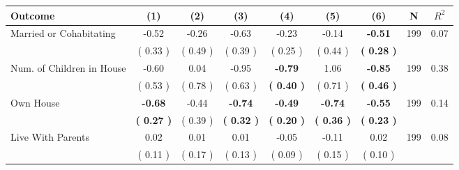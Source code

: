 \begin{tabular}{lcccccccc}
\toprule
 \textbf{Outcome} & \textbf{(1)} & \textbf{(2)} & \textbf{(3)} & \textbf{(4)} & \textbf{(5)} & \textbf{(6)} & \textbf{N} & \textbf{$ R^2$} \\
\midrule
Married or Cohabitating &     -0.52 &     -0.26 &     -0.63 &     -0.23 &     -0.14 & \textbf{    -0.51} & 199 &       0.07 \\ 
 & (     0.33 ) & (     0.49 ) & (     0.39 ) & (     0.25 ) & (     0.44 ) & \textbf{(     0.28 )} & \\
Num. of Children in House &     -0.60 &      0.04 &     -0.95 & \textbf{    -0.79} &      1.06 & \textbf{    -0.85} & 199 &       0.38 \\ 
 & (     0.53 ) & (     0.78 ) & (     0.63 ) & \textbf{(     0.40 )} & (     0.71 ) & \textbf{(     0.46 )} & \\
Own House & \textbf{    -0.68} &     -0.44 & \textbf{    -0.74} & \textbf{    -0.49} & \textbf{    -0.74} & \textbf{    -0.55} & 199 &       0.14 \\ 
 & \textbf{(     0.27 )} & (     0.39 ) & \textbf{(     0.32 )} & \textbf{(     0.20 )} & \textbf{(     0.36 )} & \textbf{(     0.23 )} & \\
Live With Parents &      0.02 &      0.01 &      0.01 &     -0.05 &     -0.11 &      0.02 & 199 &       0.08 \\ 
 & (     0.11 ) & (     0.17 ) & (     0.13 ) & (     0.09 ) & (     0.15 ) & (     0.10 ) & \\
\bottomrule
\end{tabular}
